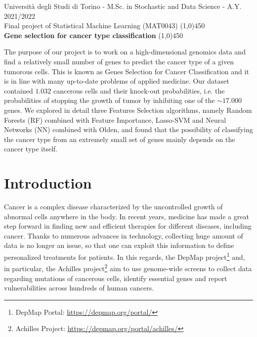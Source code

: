 \documentclass[a4paper,11pt, oneside]{article}  %
\begin{document}
\setcounter{secnumdepth}{2}
\pagestyle{plain} %

\begin{center}
	Università degli Studi di Torino - M.Sc.  in Stochastic and Data Science - A.Y.  2021/2022 \\
	\Large { Final project of Statistical Machine Learning (MAT0043)}
	\line(1,0){450}\\ 
	\vspace{0.4cm} 
	{ \huge \textbf{Gene selection for cancer type classification} }
	\vspace{0.1cm}
	\line(1,0){450} \\
\end{center}


The purpose of our project is to work on a high-dimensional genomics data and find a relatively small number of genes to predict the cancer type of a given tumorous cells. This is known as Genes Selection for Cancer Classification and it is in line with many up-to-date problems of applied medicine.  Our dataset contained $1.032$ cancerous cells and their knock-out probabilities, i.e.  the probabilities of stopping the growth of tumor by inhibiting one of the $\sim 17.000$ genes.  We explored in detail three Features Selection algorithms,  namely Random Forests (RF) combined with Feature Importance,  Lasso-SVM and Neural Networks (NN) combined with Olden,  and found that the possibility of classifying the cancer type from an extremely small set of genes mainly depends on the cancer type itself.  


\section{Introduction}
Cancer is a complex disease characterized by the uncontrolled growth of abnormal cells anywhere in the body.  In recent years,  medicine has made a great step forward in finding new and efficient therapies for different diseases,  including cancer.  Thanks to numerous advances in technology,  collecting huge amount of data is no longer an issue,  so that one can exploit this information to define personalized treatments for patients.  In this regards,  the DepMap project\footnote{DepMap Portal: \url{https://depmap.org/portal/} } and,  in particular,  the Achilles project\footnote{Achilles Project: \url{https://depmap.org/portal/achilles/} } aim to use genome-wide screens to collect data regarding mutations of cancerous cells,  identify essential genes and report vulnerabilities across hundreds of human cancers.  \\
\end{document}
